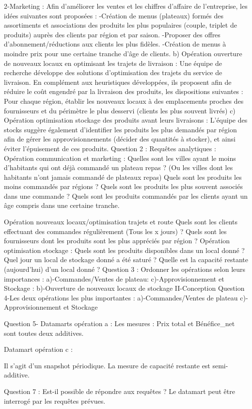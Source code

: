 \documentclass[11pt]{article}
\begin{document}
2-Marketing : Afin d’améliorer les ventes et les chiffres d’affaire de l’entreprise, les idées suivantes sont proposées : 
-Création de menus (plateaux) formés des assortiments et associations des produits les plus populaires (couple, triplet de produits) auprès des clients par région et par saison.
-Proposer des offres d’abonnement/réductions aux clients les plus fidèles.
-Création de menus à moindre prix pour une certaine tranche d’âge de clients.
b)	Opération ouverture de nouveaux locaux en optimisant les trajets de livraison : 
Une équipe de recherche développe des solutions d’optimisation des trajets du service de livraison. En complément aux heuristiques développées, ils proposent afin de réduire le coût engendré par la livraison des produits, les dispositions suivantes : 
Pour chaque région, établir les nouveaux locaux à des emplacements proches des fournisseurs et du périmètre le plus desservi (clients les plus souvent livrés)
c)	Opération optimisation stockage des produits avant leurs livraisons : 
L’équipe des stocks suggère également d’identifier les produits les plus demandés par région afin de gérer les approvisionnements (décider des quantités à stocker), et ainsi éviter l’épuisement de ces produits.
Question 2 : Requêtes analytiques :  
Opération communication et marketing : 
Quelles sont les villes ayant le moins d’habitants qui ont déjà commandé un plateau repas ? (Ou les villes dont les habitants n’ont jamais commandé de plateaux repas)
Quels sont les produits les moins commandés par régions ? 
Quels sont les produits les plus souvent associés dans une commande ?
Quels sont les produits commandés par les clients ayant un âge compris dans une certaine tranche.

Opération nouveaux locaux/optimisation trajets et route 
Quels sont les clients effectuant des commandes régulièrement (Tous les x jours) ?  
Quels sont les fournisseurs dont les produits sont les plus appréciés par région ?
Opération optimisation stockage : 
Quels sont les produits disponibles dans un local donné ?
Quel jour un local de stockage donné a été saturé ? 
Quelle est la capacité restante (aujourd’hui) d’un local donné ?
Question 3 : Ordonner les opérations selon leurs importances :
a)-Commandes/Ventes de plateau: 
c)-Approvisionnement et Stockage :
b)-Ouverture de nouveaux locaux de stockage 
II-Conception
Question 4-Les deux opérations les plus importantes : 
a)-Commandes/Ventes de plateau
c)-Approvisionnement et Stockage 








Question 5- Datamarts opération a : 
Les mesures : Prix total et Bénéfice_net sont toutes deux additives.


Datamart opération c :
 


Il s’agit d’un snapshot périodique.
La mesure de capacité restante est semi-additive.

Question 7 : Est-il  possible de répondre aux requêtes ? 
Le datamart peut être interrogé par les requêtes prévues.
\end{document}
